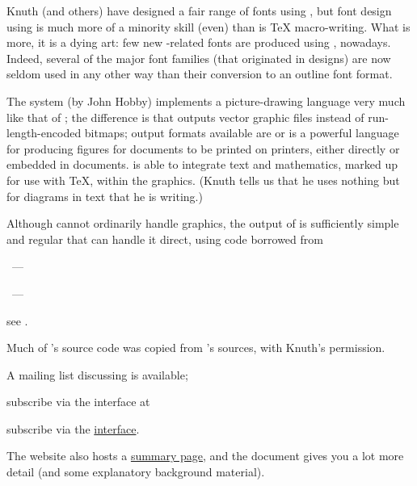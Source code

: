 Knuth (and others) have designed a fair range of fonts using \MF{},
but font design using \MF{} is much more of a minority skill (even) than is
\TeX{} macro-writing.
What is more, it is a dying art: few new \tex{}-related fonts are
produced using \MF{}, nowadays.  Indeed, several of the major font
families (that originated in \MF{} designs) are now seldom used in any
other way than their conversion to an outline font format.


The \MP{} system (by John Hobby) implements a picture-drawing language
very much like that of \MF{}; the difference is that \MP{} outputs
vector graphic files instead of run-length-encoded bitmaps; output
formats available are \PS{} or 
\MP{}
is a powerful language for producing figures for documents to be
printed on \PS{} printers, either directly or embedded in \AllTeX{}
documents.  \MP{} is able to integrate text and mathematics, marked up
for use with \TeX{}, within the graphics.  (Knuth tells us that he
uses nothing but \MP{} for diagrams in text that he is writing.)

Although \PDFLaTeX{} cannot ordinarily handle \PS{} graphics, the
output of \MP{} is sufficiently simple and regular that \PDFLaTeX{}
can handle it direct, using code borrowed from
\begin{hyperversion}
  ~---
\end{hyperversion}
\begin{flatversion}
  \context{}~---
\end{flatversion}
see .

Much of \MP{}'s source code was copied from \MF{}'s sources, with
Knuth's permission.

A mailing list discussing \MP{} is available;
\begin{flatversion}
  subscribe via the   interface at
\end{flatversion}
\begin{hyperversion}
  subscribe via the %
  \href{http://lists.tug.org/metapost}{  interface}.
\end{hyperversion}
The  website also hosts a %
\href{http://tug.org/metapost.html}{\MP{} summary page}, and the
 document gives you a lot more detail (and some
explanatory background material).
\begin{ctanrefs}
\item[tex-overview.pdf]
\end{ctanrefs}

